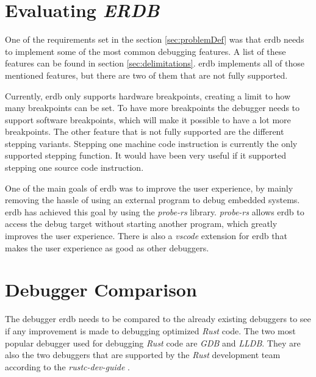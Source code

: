 \section{Evaluating \emph{ERDB}} %
One of the requirements set in the section \ref{sec:problemDef} was that \gls{erdb} needs to implement some of the most common debugging features.
A list of these features can be found in section \ref{sec:delimitations}.
\gls{erdb} implements all of those mentioned features, but there are two of them that are not fully supported.


Currently, \gls{erdb} only supports hardware breakpoints, creating a limit to how many breakpoints can be set.
To have more breakpoints the debugger needs to support software breakpoints, which will make it possible to have a lot more breakpoints.
The other feature that is not fully supported are the different stepping variants.
Stepping one machine code instruction is currently the only supported stepping function.
It would have been very useful if it supported stepping one source code instruction.


One of the main goals of \gls{erdb} was to improve the user experience, by mainly removing the hassle of using an external program to debug embedded systems.
\gls{erdb} has achieved this goal by using the \emph{probe-rs} library.
\emph{probe-rs} allows \gls{erdb} to access the debug target without starting another program, which greatly improves the user experience.
There is also a \emph{vscode} extension for \gls{erdb} that makes the user experience as good as other debuggers.



\section{Debugger Comparison} %
\label{sec:debuggercomparison}


The debugger \gls{erdb} needs to be compared to the already existing debuggers to see if any improvement is made to debugging optimized \emph{Rust} code.
The two most popular debugger used for debugging \emph{Rust} code are \emph{GDB} and \emph{LLDB}.
They are also the two debuggers that are supported by the \emph{Rust} development team according to the \emph{rustc-dev-guide} \cite{rust-dev-guide}.


